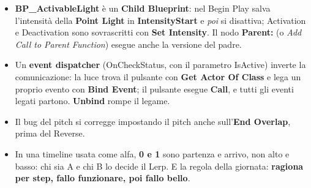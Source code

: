 \begin{itemize}
        Activation o Deactivation su ogni elemento.
  \item \textbf{BP\_ActivableLight} è un \textbf{Child Blueprint}: nel Begin Play salva
        l'intensità della \textbf{Point Light} in \textbf{IntensityStart} e \emph{poi} si
        disattiva; Activation e Deactivation sono sovrascritti con \textbf{Set Intensity}.
        Il nodo \textbf{Parent:} (o \emph{Add Call to Parent Function}) esegue anche la
        versione del padre.
  \item Un \textbf{event dispatcher} (OnCheckStatus, con il parametro IsActive) inverte
        la comunicazione: la luce trova il pulsante con \textbf{Get Actor Of Class} e lega
        un proprio evento con \textbf{Bind Event}; il pulsante esegue \textbf{Call}, e
        tutti gli eventi legati partono. \textbf{Unbind} rompe il legame.
  \item Il bug del pitch si corregge impostando il pitch anche sull'\textbf{End
        Overlap}, prima del Reverse.
  \item In una timeline usata come alfa, \textbf{0 e 1} sono partenza e arrivo, non alto e
        basso: chi sia A e chi B lo decide il Lerp. E la regola della giornata:
        \textbf{ragiona per step, fallo funzionare, poi fallo bello}.
\end{itemize}
